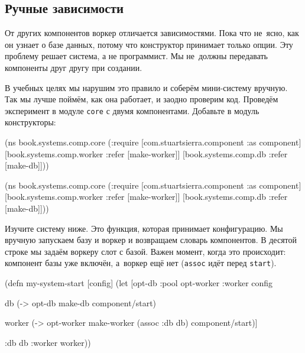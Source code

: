 \subsection{Ручные зависимости}


От других компонентов воркер отличается зависимостями. Пока что не~ясно, как он
узнает о базе данных, потому что конструктор принимает только опции. Эту
проблему решает система, а не программист. Мы не~должны передавать компоненты
друг другу при создании.

В учебных целях мы нарушим это правило и соберём мини-систему вручную. Так мы
лучше поймём, как она работает, и заодно проверим код. Проведём эксперимент в
модуле \verb|core| с двумя компонентами. Добавьте в модуль конструкторы:

\ifx\DEVICETYPE\MOBILE

\begin{english}
  \begin{clojure}
(ns book.systems.comp.core
  (:require
   [com.stuartsierra.component
    :as component]
   [book.systems.comp.worker
    :refer [make-worker]]
   [book.systems.comp.db
    :refer [make-db]]))
  \end{clojure}
\end{english}

\else

\begin{english}
  \begin{clojure}
(ns book.systems.comp.core
  (:require
   [com.stuartsierra.component :as component]
   [book.systems.comp.worker :refer [make-worker]]
   [book.systems.comp.db :refer [make-db]]))
  \end{clojure}
\end{english}

\fi

Изучите систему ниже. Это функция, которая принимает конфигурацию. Мы вручную
запускаем базу и воркер и возвращаем словарь компонентов. В десятой строке мы
задаём воркеру слот с базой. Важен момент, когда это происходит: компонент базы
уже включён, а~воркер ещё нет (\verb|assoc| идёт перед \verb|start|).

\begin{english}
  \begin{clojure/lines}
(defn my-system-start
  [config]
  (let [{opt-db :pool
         opt-worker :worker} config

        db (-> opt-db
               make-db
               component/start)

        worker (-> opt-worker
                   make-worker
                   (assoc :db db)
                   component/start)]

    {:db db :worker worker}))
  \end{clojure/lines}
\end{english}

